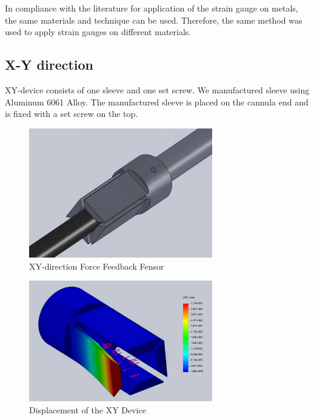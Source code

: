 	In compliance with the literature \cite{StrGugeInst} for application of the strain gauge on metals, the same materials and technique can be used. Therefore, the same method was used to apply strain gauges on different materials.

\subsection{X-Y direction}
\label{sec:xyDir}

XY-device consists of one sleeve and one set screw. We manufactured sleeve using Aluminum 6061 Alloy. %
The manufactured sleeve is placed on the cannula end and is fixed with a set screw on the top.

\begin{figure}[h]
	\begin{center}
		\includegraphics[width=80mm]{fig/methods/xy_dev_cl.png}
	\end{center}
	\vspace{-4mm}
	\caption[XY-direction force feedback sensor]
	{XY-direction Force Feedback Fensor}
	\label{fig:xy-direction}
	\vspace{-2mm}
\end{figure}

\begin{figure}[h]
	\begin{center}
		\includegraphics[width=80mm]{fig/methods/old_sleeve_displ.png}
	\end{center}
	\vspace{-4mm}
	\caption[XY-direction force feedback sensor]
	{Displacement of the XY Device}
	\label{fig:xy-displ}
	\vspace{-2mm}
\end{figure}

